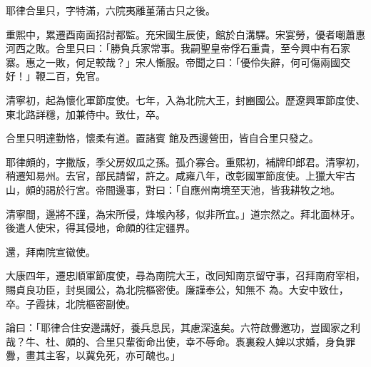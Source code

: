 \begin{pinyinscope}
 耶律合里只，字特滿，六院夷離堇蒲古只之後。



 重熙中，累遷酉南面招討都監。充宋國生辰使，館於白溝驛。宋宴勞，優者嘲蕭惠河西之敗。合里只曰：「勝負兵家常事。我嗣聖皇帝俘石重貴，至今興中有石家寨。惠之一敗，何足較哉？」宋人慚服。帝聞之曰：「優伶失辭，何可傷兩國交好！」鞭二百，免官。



 清寧初，起為懷化軍節度使。七年，入為北院大王，封豳國公。歷遼興軍節度使、東北路詳穩，加兼侍中。致仕，卒。



 合里只明達勤恪，懷柔有道。置諸賓
 館及西邊營田，皆自合里只發之。



 耶律頗的，字撒版，季父房奴瓜之孫。孤介寡合。重熙初，補牌印郎君。清寧初，稍遷知易州。去官，部民請留，許之。咸雍八年，改彰國軍節度使。上獵大牢古山，頗的謁於行宮。帝間邊事，對曰：「自應州南境至天池，皆我耕牧之地。



 清寧間，邊將不謹，為宋所侵，烽堠內移，似非所宜。」道宗然之。拜北面林牙。後遣人使宋，得其侵地，命頗的往定疆界。



 還，拜南院宣徽使。



 大康四年，遷忠順軍節度使，尋為南院大王，改同知南京留守事，召拜南府宰相，賜貞良功臣，封吳國公，為北院樞密使。廉謹奉公，知無不
 為。大安中致仕，卒。子霞抹，北院樞密副使。



 論曰：「耶律合住安邊講好，養兵息民，其慮深遠矣。六符啟釁邀功，豈國家之利哉？牛、杜、頗的、合里只輩銜命出使，幸不辱命。褭裏殺人婢以求婚，身負罪釁，畫其主客，以冀免死，亦可醜也。」



\end{pinyinscope}